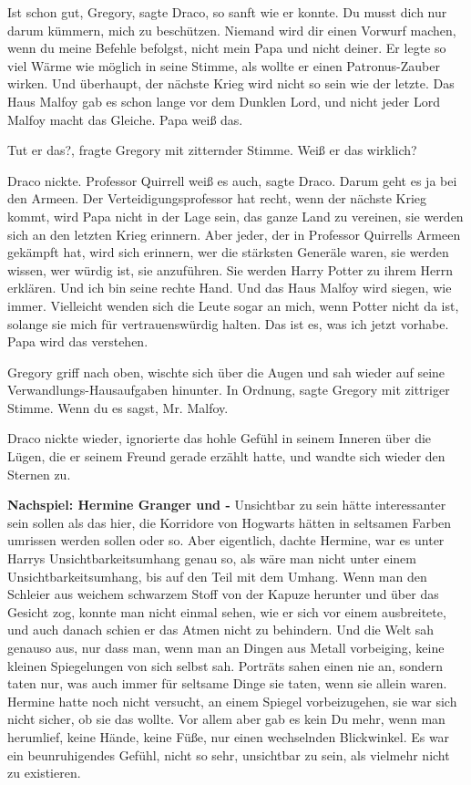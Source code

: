 \glqq{}Ist schon gut, Gregory\grqq{}, sagte Draco, so sanft wie er konnte. \glqq{}
Du musst dich nur darum kümmern, mich zu beschützen. Niemand wird dir einen
Vorwurf machen, wenn du meine Befehle befolgst, nicht mein Papa und nicht
deiner.\grqq{} Er legte so viel Wärme wie möglich in seine Stimme, als wollte er
einen Patronus-Zauber wirken. \glqq{}Und überhaupt, der nächste Krieg wird nicht
so sein wie der letzte. Das Haus Malfoy gab es schon lange vor dem Dunklen Lord,
und nicht jeder Lord Malfoy macht das Gleiche. Papa weiß das.\grqq{}

\glqq{}Tut er das?\grqq{}, fragte Gregory mit zitternder Stimme. \glqq{}Weiß er
das wirklich?\grqq{}

Draco nickte. \glqq{}Professor Quirrell weiß es auch\grqq{}, sagte Draco. \glqq{}
Darum geht es ja bei den Armeen. Der Verteidigungsprofessor hat recht, wenn der
nächste Krieg kommt, wird Papa nicht in der Lage sein, das ganze Land zu
vereinen, sie werden sich an den letzten Krieg erinnern. Aber jeder, der in
Professor Quirrells Armeen gekämpft hat, wird sich erinnern, wer die stärksten
Generäle waren, sie werden wissen, wer würdig ist, sie anzuführen. Sie werden
Harry Potter zu ihrem Herrn erklären. Und ich bin seine rechte Hand. Und das
Haus Malfoy wird siegen, wie immer. Vielleicht wenden sich die Leute sogar an
mich, wenn Potter nicht da ist, solange sie mich für vertrauenswürdig halten.
Das ist es, was ich jetzt vorhabe. Papa wird das verstehen.\grqq{}

Gregory griff nach oben, wischte sich über die Augen und sah wieder auf seine
Verwandlungs-Hausaufgaben hinunter. \glqq{}In Ordnung\grqq{}, sagte Gregory mit
zittriger Stimme. \glqq{}Wenn du es sagst, Mr. Malfoy.\grqq{}

Draco nickte wieder, ignorierte das hohle Gefühl in seinem Inneren über die
Lügen, die er seinem Freund gerade erzählt hatte, und wandte sich wieder den
Sternen zu.

\textbf{Nachspiel: Hermine Granger und -}
Unsichtbar zu sein hätte interessanter sein sollen als das hier, die Korridore
von Hogwarts hätten in seltsamen Farben umrissen werden sollen oder so. Aber
eigentlich, dachte Hermine, war es unter Harrys Unsichtbarkeitsumhang genau so,
als wäre man nicht unter einem Unsichtbarkeitsumhang, bis auf den Teil mit dem
Umhang. Wenn man den Schleier aus weichem schwarzem Stoff von der Kapuze
herunter und über das Gesicht zog, konnte man nicht einmal sehen, wie er sich
vor einem ausbreitete, und auch danach schien er das Atmen nicht zu behindern.
Und die Welt sah genauso aus, nur dass man, wenn man an Dingen aus Metall
vorbeiging, keine kleinen Spiegelungen von sich selbst sah. Porträts sahen einen
nie an, sondern taten nur, was auch immer für seltsame Dinge sie taten, wenn sie
allein waren. Hermine hatte noch nicht versucht, an einem Spiegel vorbeizugehen,
sie war sich nicht sicher, ob sie das wollte. Vor allem aber gab es kein Du
mehr, wenn man herumlief, keine Hände, keine Füße, nur einen wechselnden
Blickwinkel. Es war ein beunruhigendes Gefühl, nicht so sehr, unsichtbar zu
sein, als vielmehr nicht zu existieren.

